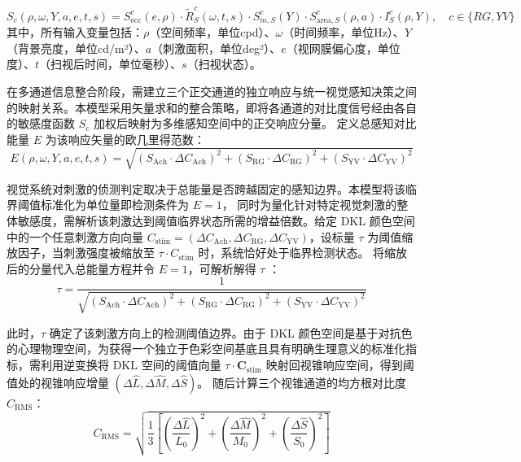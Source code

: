 \begin{equation}
S_c(\rho, \omega, Y, a, e, t, s) = S_{\text{ecc}}^{c}(e, \rho) \cdot \tilde{R}_S^{c}(\omega, t, s) \cdot S_{m,S}^{c}(Y) \cdot S_{\text{area},S}^{c}(\rho, a) \cdot I_S^{c}(\rho, Y), \quad c \in \{RG, YV\}
\label{eq:color_sensitivity}
\end{equation}
其中，所有输入变量包括：\(\rho\)（空间频率，单位cpd）、\(\omega\)（时间频率，单位Hz）、\(Y\)（背景亮度，单位cd/m²）、\(a\)（刺激面积，单位deg²）、\(e\)（视网膜偏心度，单位度）、\(t\)（扫视后时间，单位毫秒）、\(s\)（扫视状态）。

在多通道信息整合阶段，需建立三个正交通道的独立响应与统一视觉感知决策之间的映射关系。本模型采用矢量求和的整合策略，即将各通道的对比度信号经由各自的敏感度函数 $S_c$ 加权后映射为多维感知空间中的正交响应分量。
定义总感知对比能量 $E$ 为该响应矢量的欧几里得范数：
\begin{equation}
E(\rho, \omega, Y, a, e, t, s) = \sqrt{ \left( S_{\text{Ach}} \cdot \Delta C_{\text{Ach}} \right)^2 + \left( S_{\text{RG}} \cdot \Delta C_{\text{RG}} \right)^2 + \left( S_{\text{YV}} \cdot \Delta C_{\text{YV}} \right)^2 }
\label{eq:total_energy}
\end{equation}

视觉系统对刺激的侦测判定取决于总能量是否跨越固定的感知边界。本模型将该临界阈值标准化为单位量即检测条件为 $E = 1$，
同时为量化针对特定视觉刺激的整体敏感度，需解析该刺激达到阈值临界状态所需的增益倍数。给定 DKL 颜色空间中的一个任意刺激方向向量 $C_{\text{stim}} = (\Delta C_{\text{Ach}}, \Delta C_{\text{RG}}, \Delta C_{\text{YV}})$，设标量 $\tau$ 为阈值缩放因子，当刺激强度被缩放至 $\tau \cdot C_{\text{stim}}$ 时，系统恰好处于临界检测状态。
将缩放后的分量代入总能量方程并令 $E = 1$，可解析解得 $\tau$ ：
\begin{equation}
\tau = \frac{1}{\sqrt{ (S_{\text{Ach}} \cdot \Delta C_{\text{Ach}})^2 + (S_{\text{RG}} \cdot \Delta C_{\text{RG}})^2 + (S_{\text{YV}} \cdot \Delta C_{\text{YV}})^2 }}
\label{eq:tau_calculation}
\end{equation}

此时，$\tau$ 确定了该刺激方向上的检测阈值边界。由于 DKL 颜色空间是基于对抗色的心理物理空间，为获得一个独立于色彩空间基底且具有明确生理意义的标准化指标，需利用逆变换将 DKL 空间的阈值向量 $\tau \cdot \mathbf{C}_{\text{stim}}$ 映射回视锥响应空间，得到阈值处的视锥响应增量 $(\Delta \widehat{L}, \Delta \widehat{M}, \Delta \widehat{S})$。
随后计算三个视锥通道的均方根对比度 $C_{\mathrm{RMS}}$：
\begin{equation}
C_{\mathrm{RMS}} = \sqrt{\frac{1}{3} \left[ \left( \frac{\Delta \widehat{L}}{L_0} \right)^2 + \left( \frac{\Delta \widehat{M}}{M_0} \right)^2 + \left( \frac{\Delta \widehat{S}}{S_0} \right)^2 \right]}
\end{equation}

